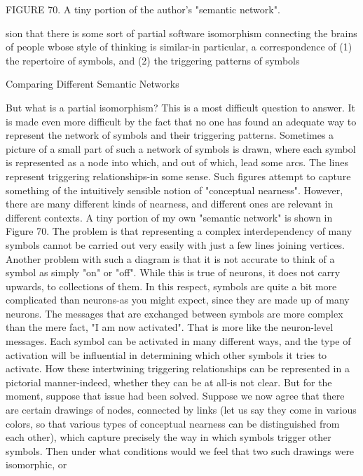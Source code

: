 FIGURE 70. A tiny portion of the author's "semantic network".





sion that there is some sort of partial software isomorphism connecting the brains of
people wbose style of thinking is similar-in particular, a correspondence of (1) the
repertoire of symbols, and (2) the triggering patterns of symbols

                       Comparing Different Semantic Networks

But what is a partial isomorphism? This is a most difficult question to answer. It is made
even more difficult by the fact that no one has found an adequate way to represent the
network of symbols and their triggering patterns. Sometimes a picture of a small part of
such a network of symbols is drawn, where each symbol is represented as a node into
which, and out of which, lead some arcs. The lines represent triggering relationships-in
some sense. Such figures attempt to capture something of the intuitively sensible notion
of "conceptual nearness". However, there are many different kinds of nearness, and
different ones are relevant in different contexts. A tiny portion of my own "semantic
network" is shown in Figure 70. The problem is that representing a complex
interdependency of many symbols cannot be carried out very easily with just a few lines
joining vertices.
        Another problem with such a diagram is that it is not accurate to think of a symbol
as simply "on" or "off". While this is true of neurons, it does not carry upwards, to
collections of them. In this respect, symbols are quite a bit more complicated than
neurons-as you might expect, since they are made up of many neurons. The messages that
are exchanged between symbols are more complex than the mere fact, "I am now
activated". That is more like the neuron-level messages. Each symbol can be activated in
many different ways, and the type of activation will be influential in determining which
other symbols it tries to activate. How these intertwining triggering relationships can be
represented in a pictorial manner-indeed, whether they can be at all-is not clear.
        But for the moment, suppose that issue had been solved. Suppose we now agree
that there are certain drawings of nodes, connected by links (let us say they come in
various colors, so that various types of conceptual nearness can be distinguished from
each other), which capture precisely the way in which symbols trigger other symbols.
Then under what conditions would we feel that two such drawings were isomorphic, or
